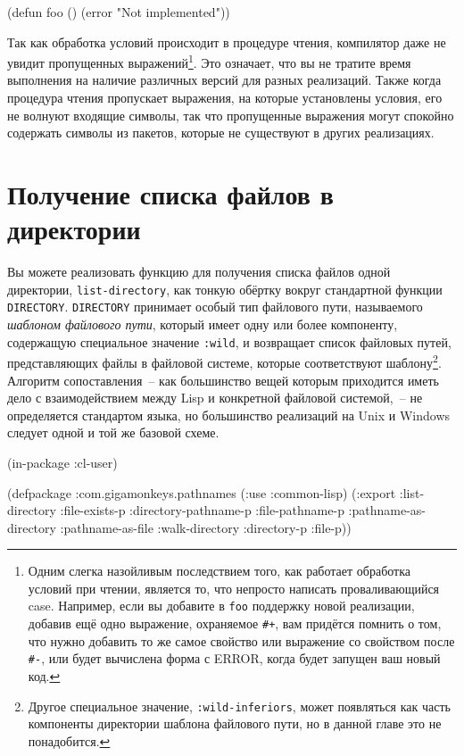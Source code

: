 \begin{myverb}
(defun foo ()
  (error "Not implemented"))
\end{myverb}

Так как обработка условий происходит в процедуре чтения, компилятор даже не увидит пропущенных
выражений\footnote{Одним слегка назойливым последствием того, как работает обработка
  условий при чтении, является то, что непросто написать проваливающийся case. Например,
  если вы добавите в \lstinline{foo} поддержку новой реализации, добавив ещё одно выражение,
  охраняемое \lstinline!#+!, вам придётся помнить о том, что нужно добавить то же самое
  свойство или выражение со свойством после \lstinline!#-!, или будет вычислена форма с
  ERROR, когда будет запущен ваш новый код.}\hspace{\footnotenegspace}. Это означает, что вы не тратите время
выполнения на наличие различных версий для разных реализаций. Также когда процедура чтения
пропускает выражения, на которые установлены условия, его не волнуют входящие символы, так
что пропущенные выражения могут спокойно содержать символы из пакетов, которые не
существуют в других реализациях.

\section{Получение списка файлов в директории}

Вы можете реализовать функцию для получения списка файлов одной директории,
\lstinline{list-directory}, как тонкую обёртку вокруг стандартной функции
\lstinline{DIRECTORY}. \lstinline{DIRECTORY} принимает особый тип файлового пути,
называемого \textit{шаблоном файлового пути}, который имеет одну или более компоненту,
содержащую специальное значение \lstinline{:wild}, и возвращает список файловых путей,
представляющих файлы в файловой системе, которые соответствуют шаблону\footnote{Другое
  специальное значение, \lstinline{:wild-inferiors}, может появляться как часть компоненты
  директории шаблона файлового пути, но в данной главе это не понадобится.}\hspace{\footnotenegspace}. Алгоритм
сопоставления~-- как большинство вещей которым приходится иметь дело с взаимодействием
между Lisp и конкретной файловой системой,~-- не определяется стандартом языка, но
большинство реализаций на Unix и Windows следует одной и той же базовой схеме.

\begin{lrbox}{\chonefiveone}
  \begin{minipage}{\linewidth}
\begin{myverb}
(in-package :cl-user)

(defpackage :com.gigamonkeys.pathnames
  (:use :common-lisp)
  (:export
   :list-directory
   :file-exists-p
   :directory-pathname-p
   :file-pathname-p
   :pathname-as-directory
   :pathname-as-file
   :walk-directory
   :directory-p
   :file-p))
\end{myverb}
  \end{minipage}
\end{lrbox}


